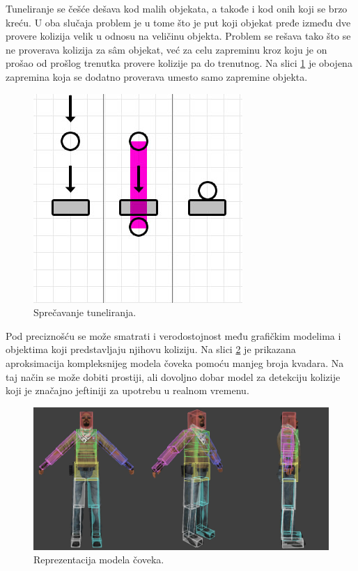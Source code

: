 \documentclass{article}
\begin{document}
{Tuneliranje se češće dešava kod malih objekata, a takođe i kod 
onih koji se brzo kreću. U oba slučaja problem je u tome što je put koji objekat pređe između dve provere 
kolizija velik u odnosu na veličinu objekta. 
Problem se rešava tako što se ne proverava kolizija za sâm objekat, već za celu zapreminu kroz koju je on prošao 
od prošlog trenutka provere kolizije pa do trenutnog. Na slici \ref{fig:tunnel_fix} je obojena zapremina 
koja se dodatno proverava umesto samo zapremine objekta.



\begin{figure}[h!]
	\begin{center}
	\includegraphics[scale=0.45]{tunnel_fixed.png}
	\end{center}
	\caption{Sprečavanje tuneliranja.}
	\label{fig:tunnel_fix}
\end{figure}

Pod preciznošću se može smatrati i verodostojnost među grafičkim modelima i objektima koji predstavljaju njihovu koliziju.
Na slici \ref{fig:hitbox} je prikazana aproksimacija kompleksnijeg modela čoveka pomoću manjeg broja kvadara.
Na taj način se može dobiti prostiji, ali dovoljno dobar model za detekciju kolizije koji je značajno 
jeftiniji za upotrebu u realnom vremenu. 

\begin{figure}[h!]
	\begin{center}
	\includegraphics[scale=0.45]{hitbox.png}
	\end{center}
	\caption{Reprezentacija modela čoveka.}
	\label{fig:hitbox}
\end{figure}

}
\end{document}
